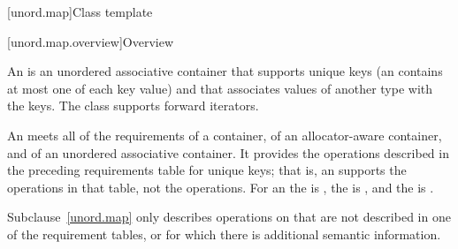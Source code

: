 [unord.map]{Class template }%

[unord.map.overview]{Overview}

\pnum
{}%
%
An  is an unordered associative container that
supports unique keys (an  contains at most one of each
key value) and that associates values of another type
 with the keys.
The  class
supports forward iterators.

\pnum
An  meets all of the requirements
of a container,
of an allocator-aware container, and
of an unordered associative container.
It provides the operations described in the preceding requirements table for unique keys;
that is, an  supports the  operations in that table,
not the  operations.
For an  the  is ,
the  is ,
and the  is .

\pnum
Subclause~\ref{unord.map} only describes operations on  that
are not described in one of the requirement tables, or for which there
is additional semantic information.

